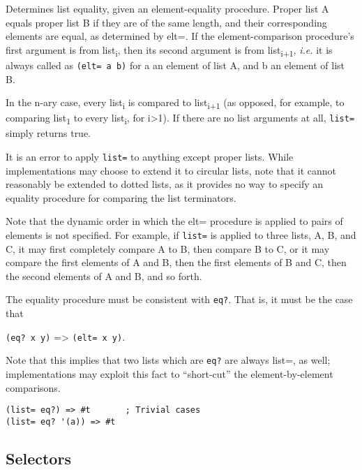   \begin{entry}{%
      }

     Determines list equality, given an
    element-equality procedure. Proper list A equals proper list B if
    they are of the same length, and their corresponding elements are
    equal, as determined by elt=. If the element-comparison
    procedure's first argument is from list\textsubscript{i}, then its
    second argument is from list\textsubscript{i+1}, \emph{i.e.} it is
    always called as \texttt{(elt=\ a\ b)} for a an element of list A,
    and b an element of list B.

    In the n-ary case, every list\textsubscript{i} is compared to
    list\textsubscript{i+1} (as opposed, for example, to comparing
    list\textsubscript{1} to every list\textsubscript{i}, for
    i\textgreater{}1). If there are no list arguments at all,
    \texttt{list=} simply returns true.

    It is an error to apply \texttt{list=} to anything except proper
    lists.  While implementations may choose to extend it to circular
    lists, note that it cannot reasonably be extended to dotted lists,
    as it provides no way to specify an equality procedure for
    comparing the list terminators.

    Note that the dynamic order in which the elt= procedure is applied
    to pairs of elements is not specified. For example, if
    \texttt{list=} is applied to three lists, A, B, and C, it may
    first completely compare A to B, then compare B to C, or it may
    compare the first elements of A and B, then the first elements of
    B and C, then the second elements of A and B, and so forth.

    The equality procedure must be consistent with \texttt{eq?}. That
    is, it must be the case that

    \texttt{(eq?\ x\ y)} =\textgreater{} \texttt{(elt=\ x\ y)}.

    Note that this implies that two lists which are \texttt{eq?} are
    always list=, as well; implementations may exploit this fact to
    ``short-cut'' the element-by-element comparisons.

\begin{verbatim}
(list= eq?) => #t       ; Trivial cases
(list= eq? '(a)) => #t
\end{verbatim}
  \end{entry}

\subsection{{Selectors}}\label{selectors}

